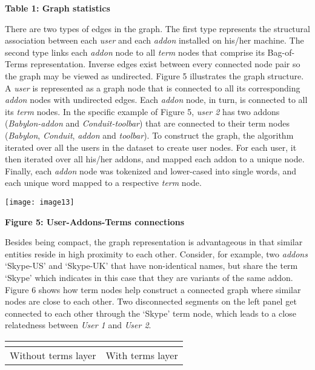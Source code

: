 \documentclass{article} %
\begin{document}
\textbf{Table 1: Graph statistics}



There are two types of edges in the graph. The first type represents the structural association between each \textit{user} and each\textit{ addon} installed on his/her machine. The second type links each \textit{addon} node to all\textit{ term} nodes that comprise its Bag-of-Terms representation. Inverse edges exist between every connected node pair so the graph may be viewed as undirected. Figure 5 illustrates the graph structure. A \textit{user} is represented as a graph node that is connected to all its corresponding \textit{addon} nodes with undirected edges. Each \textit{addon} node, in turn, is connected to all its \textit{term} nodes. In the specific example of Figure 5, \textit{user 2} has two addons (\textit{Babylon-addon} and \textit{Conduit-toolbar}) that are connected to their term nodes (\textit{Babylon},\textit{ Conduit},\textit{ addon} and\textit{ toolbar}). To construct the graph, the algorithm iterated over all the users in the dataset to create user nodes. For each user, it then iterated over all his/her addons, and mapped each addon to a unique node. Finally, each \textit{addon} node was tokenized and lower-cased into single words, and each unique word mapped to a respective \textit{term} node.

\noindent \texttt{[image: image13]}

\noindent \textbf{Figure 5: User-Addons-Terms connections}

  Besides being compact, the graph representation is advantageous in that similar entities reside in high proximity to each other. Consider, for example, two\textit{ addons} `Skype-US' and `Skype-UK' that have non-identical names, but share the term `Skype' which indicates in this case that they are variants of the same addon. Figure 6 shows how term nodes help construct a connected graph where similar nodes are close to each other. Two disconnected segments on the left panel get connected to each other through the `Skype' term node, which leads to a close relatedness between\textit{ User 1} and\textit{ User 2}. 



\begin{tabular}{|p{2.1in}|p{2.1in}|} \hline 
\textbf{} & \textbf{} \\ \hline 
Without terms layer\textbf{} & With terms layer\textbf{} \\ \hline 
\end{tabular}
\end{document}
